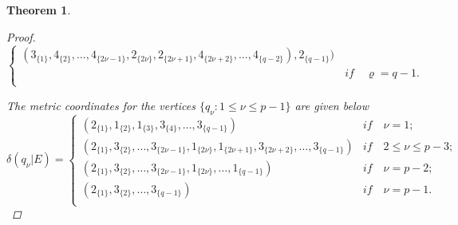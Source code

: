\documentclass[]{interact}
\theoremstyle{plain}%
\newtheorem{theorem}{Theorem}[section]
\theoremstyle{definition}
\theoremstyle{remark}
\begin{document}
\begin{theorem}
\begin{proof}
\begin{equation*}
\begin{cases}
                    (3_{\{1\}},4_{\{2\}}, \ldots,4_{\{2\nu-1\}},2_{\{2\nu\}},2_{\{2\nu+1\}},4_{\{2\nu+2\}},\ldots, 4_{\{q-2\}}),2_{\{q-1\}})\\\qquad  \qquad \qquad \qquad \qquad \qquad \qquad \qquad \qquad \qquad  \qquad \qquad\qquad\qquad\quad \textit{if}\quad\varrho= q-1.\\
                    \end{cases}
                    \end{equation*}
                    
                \noindent The metric coordinates for the vertices 
                     $\{q_\nu:1\leq \nu\leq {p-1} \}$ are given below
                        \begin{equation*}
                        \delta(q_{\nu}|E)=
                   \begin{cases}
(2_{\{1\}},1_{\{2\}}, 1_{\{3\}}, 3_{\{4\}},\ldots,3_{\{q-1\}})&\textit{if}\quad  \nu=1 ;\\
                   (2_{\{1\}},3_{\{2\}}, \ldots, 3_{\{2\nu-1\}},1_{\{2\nu\}},1_{\{2\nu+1\}},3_{\{2\nu+2\}},\ldots,3_{\{q-1\}})&\textit{if}\quad  2 \leq \nu  \leq p-3 ;\\
                     (2_{\{1\}},3_{\{2\}}, \ldots, 3_{\{2\nu-1\}},1_{\{2\nu\}},\ldots,1_{\{q-1\}})&\textit{if}\quad  \nu= p-2 ;\\
                     (2_{\{1\}},3_{\{2\}}, \ldots, 3_{\{q-1\}})&\textit{if}\quad  \nu= p-1.\\
                     \end{cases}
                     \end{equation*}
                     

\end{proof}
\end{theorem}
\end{document}
